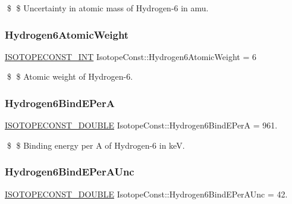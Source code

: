 \$ \$ Uncertainty in atomic mass of Hydrogen-\/6 in amu. \mbox{\label{group___isotope_const-_hydrogen-_h6_ga1e76f5e22a68a438b5c225215588635b}} 
\subsubsection{\texorpdfstring{Hydrogen6\+Atomic\+Weight}{Hydrogen6AtomicWeight}}
{\footnotesize\ttfamily \mbox{\hyperlink{group___isotope_const-_macros_ga5f18360b3e99483a35c32d789e62621c}{I\+S\+O\+T\+O\+P\+E\+C\+O\+N\+S\+T\+\_\+\+I\+NT}} Isotope\+Const\+::\+Hydrogen6\+Atomic\+Weight = 6}

\$ \$ Atomic weight of Hydrogen-\/6. \mbox{\label{group___isotope_const-_hydrogen-_h6_ga4d5c3c30c2a82620c9f2f8bba6f78c35}} 
\subsubsection{\texorpdfstring{Hydrogen6\+Bind\+E\+PerA}{Hydrogen6BindEPerA}}
{\footnotesize\ttfamily \mbox{\hyperlink{group___isotope_const-_macros_ga8f45a7272ce02c0b4c65c44636ed719a}{I\+S\+O\+T\+O\+P\+E\+C\+O\+N\+S\+T\+\_\+\+D\+O\+U\+B\+LE}} Isotope\+Const\+::\+Hydrogen6\+Bind\+E\+PerA = 961.}

\$ \$ Binding energy per A of Hydrogen-\/6 in keV. \mbox{\label{group___isotope_const-_hydrogen-_h6_gadff32349e71dfd9a1f253e8fe53f6044}} 
\subsubsection{\texorpdfstring{Hydrogen6\+Bind\+E\+Per\+A\+Unc}{Hydrogen6BindEPerAUnc}}
{\footnotesize\ttfamily \mbox{\hyperlink{group___isotope_const-_macros_ga8f45a7272ce02c0b4c65c44636ed719a}{I\+S\+O\+T\+O\+P\+E\+C\+O\+N\+S\+T\+\_\+\+D\+O\+U\+B\+LE}} Isotope\+Const\+::\+Hydrogen6\+Bind\+E\+Per\+A\+Unc = 42.}

